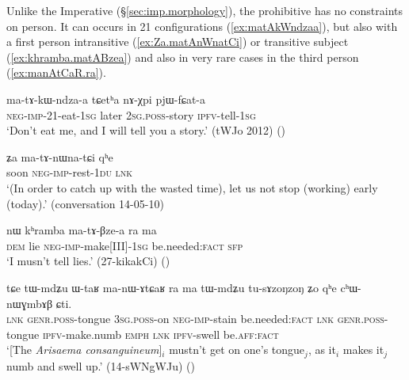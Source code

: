 Unlike the Imperative (§\ref{sec:imp.morphology}), the prohibitive has no constraints on person. It can occurs in 2\fl{}1 configurations (\ref{ex:matAkWndzaa}), but also with a first person intransitive (\ref{ex:Za.matAnWnatCi}) or transitive subject (\ref{ex:khramba.matABzea}) and also in very rare cases in the third person (\ref{ex:manAtCaR.ra}).

\begin{exe}
\ex  \label{ex:matAkWndzaa}
\gll ma-tɤ-kɯ-ndza-a tɕetʰa nɤ-χpi pjɯ-fɕat-a \\
\textsc{neg}-\textsc{imp}-2\fl{}1-eat-\textsc{1sg} later \textsc{2sg}.\textsc{poss}-story \textsc{ipfv}-tell-\textsc{1sg} \\
\glt `Don't eat me, and I will tell you a story.' (tWJo 2012) ()
\end{exe}
 
\begin{exe}
\ex  \label{ex:Za.matAnWnatCi}
\gll ʑa ma-tɤ-nɯna-tɕi qʰe \\
soon \textsc{neg}-\textsc{imp}-rest-\textsc{1du} \textsc{lnk} \\
\glt `(In order to catch up with the wasted time), let us not stop (working) early (today).' (conversation 14-05-10)
\end{exe}

\begin{exe}
\ex  \label{ex:khramba.matABzea}
\gll nɯ kʰramba ma-tɤ-βze-a ra ma \\
\textsc{dem} lie  \textsc{neg}-\textsc{imp}-make[III]-\textsc{1sg} be.needed:\textsc{fact} \textsc{sfp} \\
\glt `I musn't tell lies.' (27-kikakCi)
()
\end{exe}

\begin{exe}
\ex  \label{ex:manAtCaR.ra}
\gll tɕe tɯ-mdʑu ɯ-taʁ ma-nɯ-ɤtɕaʁ ra ma tɯ-mdʑu tu-sɤzoŋzoŋ ʑo qʰe cʰɯ-nɯɣmbɤβ ɕti. \\
\textsc{lnk} \textsc{genr}.\textsc{poss}-tongue \textsc{3sg}.\textsc{poss}-on \textsc{neg}-\textsc{imp}-stain be.needed:\textsc{fact} \textsc{lnk} \textsc{genr}.\textsc{poss}-tongue \textsc{ipfv}-make.numb \textsc{emph} \textsc{lnk} \textsc{ipfv}-swell be.\textsc{aff}:\textsc{fact} \\
\glt `[The \textit{Arisaema consanguineum}]$_i$ mustn't get on one's tongue$_j$, as it$_i$ makes it$_j$ numb and swell up.' (14-sWNgWJu)
()
\end{exe}

